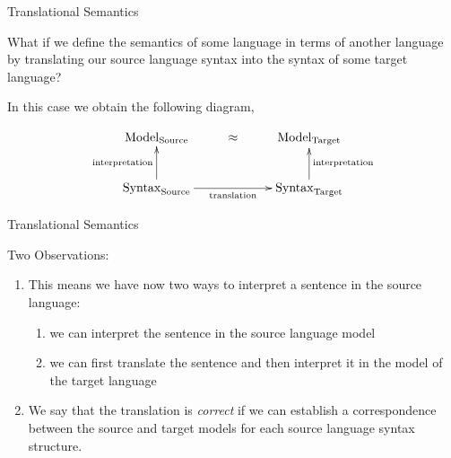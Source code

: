 \documentclass{beamer}
\begin{document}
\begin{frame}[fragile]{Translational Semantics}

\small 
What if we define the semantics of some language in terms of another language by translating our source
language syntax into the syntax of some target language?

\vspace{.1in}

In this case we obtain the following diagram,

\vspace{.1in}
\[
\xymatrix{
{\rm Model}_{\rm Source} & \approx &{\rm Model}_{\rm Target}\\
{\rm Syntax}_{\rm Source}\ar[u]^{\rm interpretation}\ar[rr]_{\rm translation}& &{\rm Syntax}_{\rm Target}\ar[u]_{\rm interpretation}
}
\]
\end{frame}

\begin{frame}[fragile]{Translational Semantics}

\small 

Two Observations:
\begin{enumerate}
\item This means we have now two ways to interpret a sentence in the source language: 
\begin{enumerate}
\item we can interpret the
sentence in the source language model 
\item we can first translate the sentence and then interpret it in the 
model of the target language
\end{enumerate}
\item We say that the translation is {\em correct} if we can establish a correspondence between the source and
target models for each source language syntax structure.
\end{enumerate}
\end{frame}
\end{document}
